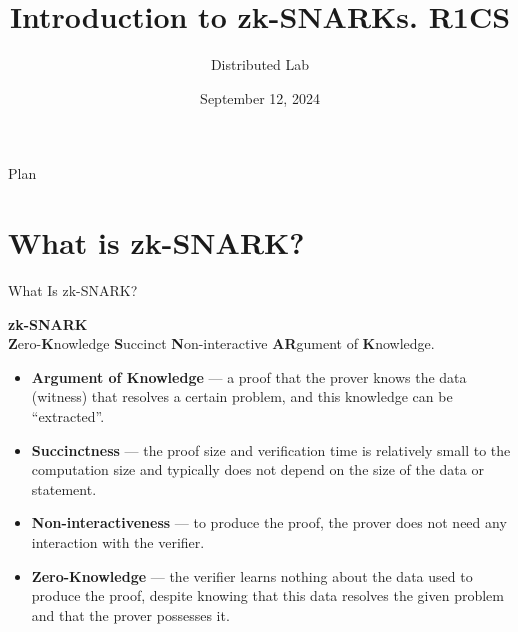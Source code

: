 \documentclass{zkdl-presentation-template}
\title[zk-SNARK: Part I]{\textbf{Introduction to zk-SNARKs. R1CS}}
\author{Distributed Lab}
\date{September 12, 2024}
\begin{document}

    \begin{frame}{Plan}
        \tableofcontents
    \end{frame}

    \section{What is zk-SNARK?}

    \begin{frame}{What Is zk-SNARK?}
        \begin{definition}
            \begin{center}
                \textbf{zk-SNARK} \\
                \textbf{Z}ero-\textbf{K}nowledge \textbf{S}uccinct \textbf{N}on-interactive \textbf{AR}gument of \textbf{K}nowledge.
            \end{center}
        \end{definition}

        

        \begin{itemize}
            \item \textbf{Argument of Knowledge} --- a proof that the prover knows the data (witness) that resolves a certain
            problem, and this knowledge can be ``extracted''. 
            \item \textbf{Succinctness} --- the proof size and verification time is relatively small to the computation size and typically does not depend on the size of 
            the data or statement. 
            \item \textbf{Non-interactiveness} --- to produce the proof, the prover does not need any interaction
            with the verifier. 
            \item \textbf{Zero-Knowledge} --- the verifier learns nothing about the data used to produce the
            proof, despite knowing that this data resolves the given problem and that the prover possesses it.
        \end{itemize}
    \end{frame}
\end{document}

